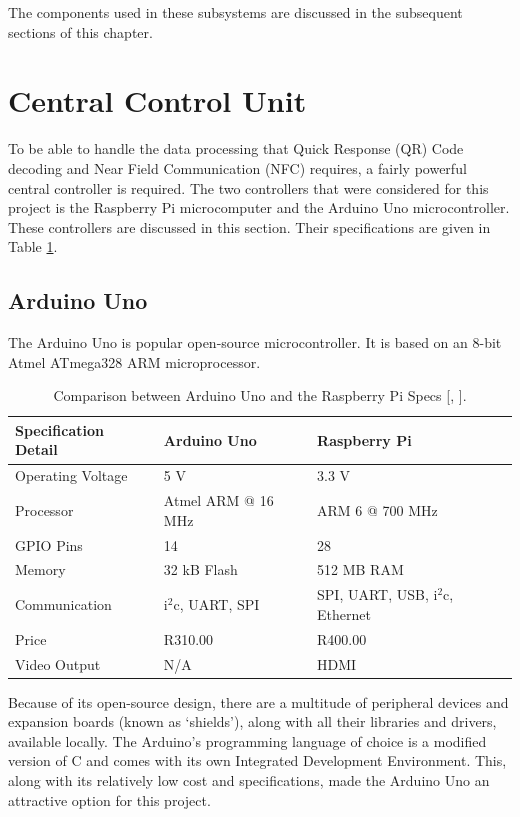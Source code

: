 The components used in these subsystems are discussed in the subsequent sections of this
chapter.

\section{Central Control Unit}

To be able to handle the data processing that Quick Response (QR) Code decoding
and Near Field Communication (NFC) requires, a fairly powerful central controller
is required. The two controllers  that were considered for this project is the Raspberry
Pi microcomputer and the Arduino Uno microcontroller. These controllers are discussed in
this section. Their specifications are given in Table \ref{tab:arduino-raspi-specs}.

\subsection{Arduino Uno}

The Arduino Uno is popular open-source microcontroller. It is based on an 8-bit
Atmel ATmega328 ARM microprocessor.

\begin{table}
\footnotesize
\centering
\caption[Comparison between Arduino Uno and the Raspberry Pi Specs.]{Comparison between
Arduino Uno and the Raspberry Pi Specs [\cite{manual:arduino-specs},
\cite{website:raspi-specs}].}
  \begin{tabular}{|l|l|l|}
  \hline
    \textbf{Specification Detail} & \textbf{Arduino Uno} & \textbf{Raspberry Pi}
    \\\hline\hline Operating Voltage & 5 V & 3.3 V \\\hline
    Processor & Atmel ARM @ 16 MHz &  ARM 6 @ 700 MHz \\\hline
    GPIO Pins & 14 & 28 \\\hline
    Memory & 32 kB Flash & 512 MB RAM\\\hline
    Communication & i$^2$c, UART, SPI & SPI, UART, USB, i$^2$c, Ethernet \\\hline
    Price & R310.00 & R400.00 \\\hline
    Video Output & N/A & HDMI \\\hline
  \end{tabular}
  \label{tab:arduino-raspi-specs}
\end{table}

Because of its open-source design, there are a multitude of peripheral devices and expansion
boards (known as `shields'), along with all their libraries and drivers,
available locally. The Arduino's programming language of choice is a modified version of
C and comes with its own Integrated Development Environment. This, along
with its relatively low cost and specifications, made the Arduino Uno
an attractive option for this project.

